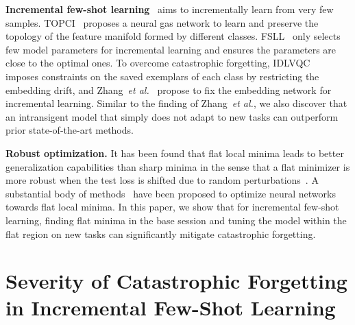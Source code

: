 \documentclass{article}
\begin{document}
\textbf{Incremental few-shot learning}~\cite{TOPIC, ren2019incremental, zhao2006mgsvf,cheraghian2021semantic,IDLVQC} aims to incrementally learn from very few samples. 
TOPCI~\cite{TOPIC} proposes a neural gas network to learn and preserve the topology of the feature manifold formed by different classes. 
FSLL~\cite{FSLL} only selects few model parameters for incremental learning and ensures the parameters are close to the optimal ones.
To overcome catastrophic forgetting, IDLVQC~\cite{IDLVQC} imposes constraints on the saved exemplars of each class by restricting the embedding drift, and
Zhang~\emph{et al.}~\cite{zhang2021few} propose to fix the embedding network for incremental learning. Similar to the finding of Zhang~\emph{et al.}, we also discover that an intransigent model 
that simply does not adapt to new tasks can outperform prior state-of-the-art methods.



\textbf{Robust optimization.}
It has been found that flat local minima leads to better generalization capabilities than sharp minima in the sense that a flat minimizer is more robust when the test loss is shifted due to random perturbations~\cite{DBLP:conf/nips/HochreiterS94,DBLP:conf/colt/HintonC93,Jiang*2020Fantastic}.
A substantial body of methods~\cite{DBLP:journals/pnas/BaldassiPZ20,pittorino2021entropic,DBLP:conf/uai/DziugaiteR17,DBLP:conf/nips/HeHY19} have been proposed to optimize neural networks towards flat local minima.
In this paper, we show that for incremental few-shot learning, finding flat minima in the base session and tuning the model within the flat region on new tasks can significantly mitigate catastrophic forgetting.


 
\section{Severity of Catastrophic Forgetting in Incremental Few-Shot Learning}\label{sec:analysis}
\end{document}
